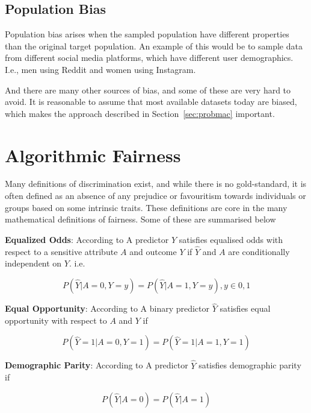 \subsection{Population Bias}

Population bias arises when the sampled population have different properties than the original target population. \cite{Olteanu:2019:FDATA} An example of this would be to sample data from different social media platforms, which have different user demographics. I.e., men using Reddit and women using Instagram.

And there are many other sources of bias, and some of these are very hard to avoid. It is reasonable to assume that most available datasets today are biased, which makes the approach described in Section~\ref{sec:probmac} important.

\section{Algorithmic Fairness}

Many definitions of discrimination exist, and while there is no gold-standard, it is often defined as an absence of any prejudice or favouritism towards individuals or groups based on some intrinsic traits. \cite{Mehrabi:2021:CSUR, Nripsuta:2019:AIES} These definitions are core in the many mathematical definitions of fairness. Some of these are summarised below

\textbf{Equalized Odds}: According to \citet{Mehrabi:2021:CSUR, Hardt:2016:NIPS} A predictor $\hat{Y}$ satisfies equalised odds with respect to a sensitive attribute $A$ and outcome $Y$ if $\hat{Y}$ and $A$ are conditionally independent on $Y$. i.e.

\begin{equation*}
    P(\hat{Y}|A=0, Y=y) = P(\hat{Y}|A=1, Y=y), y \in {0, 1}
\end{equation*}

\textbf{Equal Opportunity}: According to \citet{Mehrabi:2021:CSUR, Hardt:2016:NIPS} A binary predictor $\hat{Y}$ satisfies equal opportunity with respect to $A$ and $Y$ if

\begin{equation*}
    P(\hat{Y}=1|A=0, Y=1) = P(\hat{Y}=1|A=1, Y=1)
\end{equation*}

\textbf{Demographic Parity}: According to \citet{Mehrabi:2021:CSUR, Dwork:2012:ITCS} A predictor $\hat{Y}$ satisfies demographic parity if 

\begin{equation}
    P(\hat{Y}|A=0) = P(\hat{Y}|A=1)
    \label{eq:dempar}
\end{equation}

